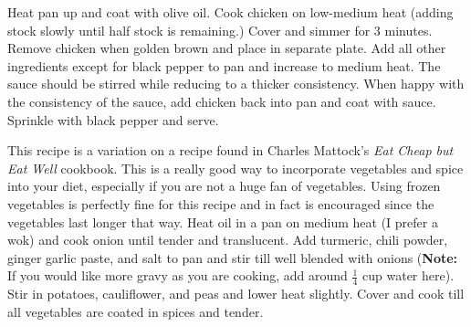 \documentclass[oneside]{recipe}
\begin{document}

Heat pan up and coat with olive oil. Cook chicken on low-medium heat (adding stock slowly until half stock is remaining.) Cover and simmer for 3 minutes. Remove chicken when golden brown and place in separate plate. Add all other ingredients except for black pepper to pan and increase to medium heat. The sauce should be stirred while reducing to a thicker consistency. When happy with the consistency of the sauce, add chicken back into pan and coat with sauce. Sprinkle with black pepper and serve. 

This recipe is a variation on a recipe found in Charles Mattock's \textit{Eat Cheap but Eat Well} cookbook. This is a really good way to incorporate vegetables and spice into your diet, especially if you are not a huge fan of vegetables. Using frozen vegetables is perfectly fine for this recipe and in fact is encouraged since the vegetables last longer that way. 
Heat oil in a pan on medium heat (I prefer a wok) and cook onion until tender and translucent. Add turmeric, chili powder, ginger garlic paste, and salt to pan and stir till well blended with onions (\textbf{Note:} If you would like more gravy as you are cooking, add around $\frac{1}{4}$ cup water here). Stir in potatoes, cauliflower, and peas and lower heat slightly. Cover and cook till all vegetables are coated in spices and tender. 
\end{document}
